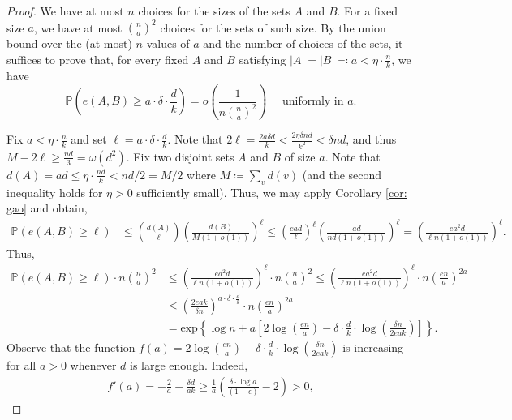 \documentclass[notitlepage]{scrartcl}
\renewcommand{\exp}{\text{exp}}
\renewcommand{\Pr}{\mathbb{P}}
\begin{document}
\begin{proof}
    We have at most $n$ choices for the sizes of the sets $A$ and $B$. For a fixed size $a$, we have at most $\binom{n}{a}^2$ choices for the sets of such size. By the union bound over the (at most) $n$ values of $a$ and the number of choices of the sets, it suffices to prove that, for every fixed $A$ and $B$ satisfying $|A| = |B|\eqqcolon a < \eta \cdot \frac{n}{k}$, we have
    \[
        \Pr\left(e(A, B) \ge a \cdot \delta \cdot \frac{d}{k}\right) = o\left(\frac{1}{n \binom{n}{a}^2}\right)\quad\text{ uniformly in $a$.}
    \]   

    Fix $a < \eta \cdot \frac{n}{k}$ and set $\ell = a \cdot \delta \cdot \frac{d}{k}$. Note that $2\ell=\frac{2a\delta d}{k}<\frac{2\eta \delta n d}{k^2}<\delta nd$, and thus $M-2\ell\ge \frac{nd}{3}=\omega(d^2).$
    Fix two disjoint sets $A$ and $B$ of size $a$. Note that $d(A) = a d\le \eta \cdot \frac{nd}{k}<nd/2=M/2$ where $M \coloneqq \sum_{v} d(v)$ (and the second inequality holds for $\eta>0$ sufficiently small). Thus, we may apply Corollary \ref{cor: gao} and obtain,
    \begin{align*}
        \Pr(e(A, B) \ge \ell) &\le \binom{d(A)}{\ell} \left(\frac{d(B)}{M(1 + o(1))}\right)^\ell \le \left(\frac{e a d}{\ell}\right)^\ell \left(\frac{ad}{nd(1+o(1))}\right)^\ell = \left(\frac{e a^2 d}{\ell n(1+o(1))}\right)^\ell. 
    \end{align*}
    Thus,
    \begin{align*}
        \Pr(e(A, B) \ge \ell) \cdot n \binom{n}{a}^2 &\le \left(\frac{e a^2 d}{\ell n (1+o(1))}\right)^\ell \cdot n \binom{n}{a}^2 \le \left(\frac{e a^2 d}{\ell n(1+o(1))}\right)^\ell \cdot n \left(\frac{en}{a}\right)^{2a} \\
        &\le \left(\frac{2 e a k}{\delta  n}\right)^{a \cdot \delta \cdot \frac{d}{k}} \cdot n \left(\frac{en}{a}\right)^{2a} \\        
        &= \exp\left\{\log n + a\left[2 \log\left(\frac{en}{a}\right) - \delta \cdot \frac{d}{k} \cdot \log\left(\frac{\delta  n}{2eak}\right)\right]\right\}.
    \end{align*}
    Observe that the function $f(a) = 2 \log\left(\frac{en}{a}\right) - \delta \cdot \frac{d}{k} \cdot \log\left(\frac{\delta  n}{2eak}\right)$ is increasing for all $a > 0$ whenever $d$ is large enough. Indeed,
    \begin{align*}
        f'(a) = -\frac{2}{a} + \frac{\delta d}{a k} \ge \frac{1}{a}\left(\frac{\delta \cdot \log d}{(1-\epsilon)} - 2\right) > 0,        
    \end{align*}

\end{proof}
\end{document}
